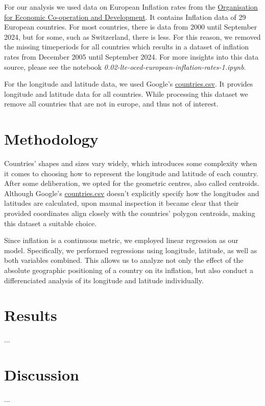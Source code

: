 \documentclass{article}
\begin{document}
    For our analysis we used data on European Inflation rates from the \href{https://data-explorer.oecd.org/vis?tm=inflation&pg=0&snb=50&vw=tb&df%5Bds%5D=dsDisseminateFinalDMZ&df%5Bid%5D=DSD_PRICES%40DF_PRICES_HICP&df%5Bag%5D=OECD.SDD.TPS&df%5Bvs%5D=1.0&dq=HRV%2BBGR%2BTUR%2BGBR%2BCHE%2BSVN%2BSWE%2BESP%2BSVK%2BPRT%2BPOL%2BNOR%2BNLD%2BLUX%2BLTU%2BLVA%2BIRL%2BITA%2BISL%2BHUN%2BGRC%2BDEU%2BFRA%2BFIN%2BEST%2BDNK%2BBEL%2BCZE%2BAUT.M.HICP.CPI.PA._T.N.GY&to%5BTIME_PERIOD%5D=false&pd=2000-01%2C2024-10}{Organisation for Economic Co-operation and Development}. It contains Inflation data of 29 European countries. For most countries, there is data from 2000 until September 2024, but for some, such as Switzerland, there is less. For this reason, we removed the missing timeperiods for all countries which results in a dataset of inflation rates from December 2005 until September 2024. For more insights into this data source, please see the notebook \emph{0.02-lte-oced-european-inflation-rates-1.ipynb}. 

    For the longitude and latitude data, we used Google's \href{https://developers.google.com/public-data/docs/canonical/countries_csv}{countries.csv}. It provides longitude and latitude data for all countries. While processing this dataset we remove all countries that are not in europe, and thus not of interest.

    \section{Methodology}

    Countries' shapes and sizes vary widely, which introduces some complexity when it comes to choosing how to represent the longitude and latitude of each country. After some deliberation, we opted for the geometric centres, also called centroids. Although Google's \href{https://developers.google.com/public-data/docs/canonical/countries_csv}{countries.csv} doesn't explicitly specify how the longitudes and latitudes are calculated, upon maunal inspection it became clear that their provided coordinates align closely with the countries' polygon centroids, making this dataset a suitable choice.
    
    Since inflation is a continuous metric, we employed linear regression as our model. Specifically, we performed regressions using longitude, latitude, as well as both variables combined. This allows us to analyze not only the effect of the absolute geographic positioning of a country on its inflation, but also conduct a differenciated analysis of its longitude and latitude individually.

    \section{Results}
    
    ...

    \section{Discussion}
    
    ...

    \newpage
    \printbibliography
\end{document}
